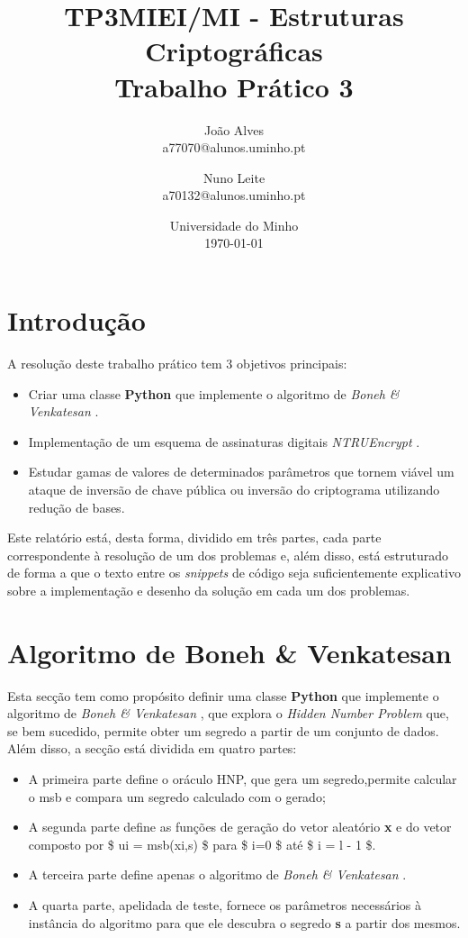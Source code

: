 \documentclass[11pt]{article}
\title{TP3}
\title{MIEI/MI - Estruturas Criptográficas\\
            \large Trabalho Prático 3}
\author{
        João Alves \\
        a77070@alunos.uminho.pt
        \and
        Nuno Leite \\
        a70132@alunos.uminho.pt
    }
\date{
        Universidade do Minho\\
        \today
    }
\providecommand{\tightlist}{%
      \setlength{\itemsep}{0pt}\setlength{\parskip}{0pt}}
\begin{document}
    
    
    \maketitle
    
    

    

    \hypertarget{introduuxe7uxe3o}{%
\section{Introdução}\label{introduuxe7uxe3o}}

    A resolução deste trabalho prático tem 3 objetivos principais:

\begin{itemize}
\tightlist
\item
  Criar uma classe \textbf{Python} que implemente o algoritmo de
  \emph{Boneh \& Venkatesan} .
\item
  Implementação de um esquema de assinaturas digitais \emph{NTRUEncrypt}
  .
\item
  Estudar gamas de valores de determinados parâmetros que tornem viável
  um ataque de inversão de chave pública ou inversão do criptograma
  utilizando redução de bases.
\end{itemize}

Este relatório está, desta forma, dividido em três partes, cada parte
correspondente à resolução de um dos problemas e, além disso, está
estruturado de forma a que o texto entre os \emph{snippets} de código
seja suficientemente explicativo sobre a implementação e desenho da
solução em cada um dos problemas.

    \hypertarget{algoritmo-de-boneh-venkatesan}{%
\section{Algoritmo de Boneh \&
Venkatesan}\label{algoritmo-de-boneh-venkatesan}}

    Esta secção tem como propósito definir uma classe \textbf{Python} que
implemente o algoritmo de \emph{Boneh \& Venkatesan} , que explora o
\emph{Hidden Number Problem} que, se bem sucedido, permite obter um
segredo a partir de um conjunto de dados. Além disso, a secção está
dividida em quatro partes:

\begin{itemize}
\tightlist
\item
  A primeira parte define o oráculo HNP, que gera um segredo,permite
  calcular o msb e compara um segredo calculado com o gerado;
\item
  A segunda parte define as funções de geração do vetor aleatório
  \textbf{x} e do vetor composto por \$ ui = msb(xi,s) \$ para \$ i=0 \$
  até \$ i = l - 1 \$.
\item
  A terceira parte define apenas o algoritmo de \emph{Boneh \&
  Venkatesan} .
\item
  A quarta parte, apelidada de teste, fornece os parâmetros necessários
  à instância do algoritmo para que ele descubra o segredo \textbf{s} a
  partir dos mesmos.
\end{itemize}
\end{document}

